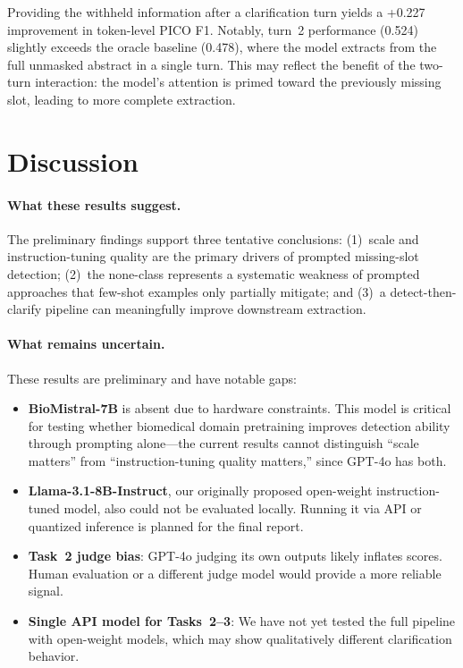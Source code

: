 \documentclass[11pt]{article}
\begin{document}
Providing the withheld information after a clarification turn yields a +0.227 improvement in token-level PICO F1.
Notably, turn~2 performance (0.524) slightly exceeds the oracle baseline (0.478), where the model extracts from the full unmasked abstract in a single turn.
This may reflect the benefit of the two-turn interaction: the model's attention is primed toward the previously missing slot, leading to more complete extraction.

\section{Discussion}

\paragraph{What these results suggest.}
The preliminary findings support three tentative conclusions: (1)~scale and instruction-tuning quality are the primary drivers of prompted missing-slot detection; (2)~the none-class represents a systematic weakness of prompted approaches that few-shot examples only partially mitigate; and (3)~a detect-then-clarify pipeline can meaningfully improve downstream extraction.

\paragraph{What remains uncertain.}
These results are preliminary and have notable gaps:

\begin{itemize}
  \item \textbf{BioMistral-7B} is absent due to hardware constraints. This model is critical for testing whether biomedical domain pretraining improves detection ability through prompting alone---the current results cannot distinguish ``scale matters'' from ``instruction-tuning quality matters,'' since GPT-4o has both.
  \item \textbf{Llama-3.1-8B-Instruct}, our originally proposed open-weight instruction-tuned model, also could not be evaluated locally. Running it via API or quantized inference is planned for the final report.
  \item \textbf{Task~2 judge bias}: GPT-4o judging its own outputs likely inflates scores. Human evaluation or a different judge model would provide a more reliable signal.
  \item \textbf{Single API model for Tasks~2--3}: We have not yet tested the full pipeline with open-weight models, which may show qualitatively different clarification behavior.
\end{itemize}
\end{document}
